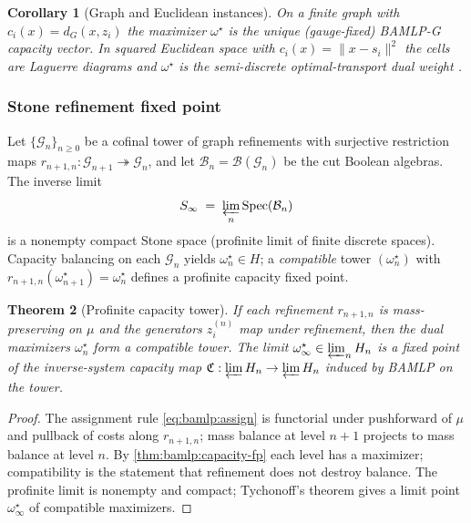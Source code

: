 \documentclass[11pt]{article}
\theoremstyle{plain}
\newtheorem{theorem}{Theorem}[section]
\newtheorem{corollary}[theorem]{Corollary}
\theoremstyle{definition}
\theoremstyle{remark}
\begin{document}
\begin{corollary}[Graph and Euclidean instances]\label{cor:bamlp:instances}
On a finite graph with $c_i(x)=d_G(x,z_i)$ the maximizer $\omega^\star$ is the
unique (gauge-fixed) BAMLP-G capacity vector. In squared Euclidean space with
$c_i(x)=\|x-s_i\|^2$ the cells are Laguerre diagrams and $\omega^\star$ is the
semi-discrete optimal-transport dual weight \cite{BAMLP:2026}.
\end{corollary}

\subsubsection{Stone refinement fixed point}

Let $\{\mathcal{G}_n\}_{n\ge0}$ be a cofinal tower of graph refinements with
surjective restriction maps $r_{n+1,n}:\mathcal{G}_{n+1}\twoheadrightarrow
\mathcal{G}_n$, and let $\mathcal{B}_n=\mathcal{B}(\mathcal{G}_n)$ be the
cut Boolean algebras. The inverse limit
\begin{equation}
  S_\infty\;=\;\varprojlim_n \mathrm{Spec}(\mathcal{B}_n)
\end{equation}
is a nonempty compact Stone space (profinite limit of finite discrete spaces).
Capacity balancing on each $\mathcal{G}_n$ yields $\omega^\star_n\in H$; a
\emph{compatible} tower $(\omega^\star_n)$ with $r_{n+1,n}(\omega^\star_{n+1})
=\omega^\star_n$ defines a profinite capacity fixed point.

\begin{theorem}[Profinite capacity tower]\label{thm:bamlp:profinite}
If each refinement $r_{n+1,n}$ is mass-preserving on $\mu$ and the generators
$z_i^{(n)}$ map under refinement, then the dual maximizers $\omega^\star_n$
form a compatible tower. The limit $\omega^\star_\infty\in\varprojlim_n H_n$
is a fixed point of the inverse-system capacity map
$\mathfrak{C}: \varprojlim H_n \to \varprojlim H_n$ induced by BAMLP on the
tower.
\end{theorem}

\begin{proof}
The assignment rule \eqref{eq:bamlp:assign} is functorial under pushforward of
$\mu$ and pullback of costs along $r_{n+1,n}$; mass balance at level $n+1$
projects to mass balance at level $n$. By \autoref{thm:bamlp:capacity-fp} each
level has a maximizer; compatibility is the statement that refinement does not
destroy balance. The profinite limit is nonempty and compact; Tychonoff's
theorem gives a limit point $\omega^\star_\infty$ of compatible maximizers.
\end{proof}
\end{document}
